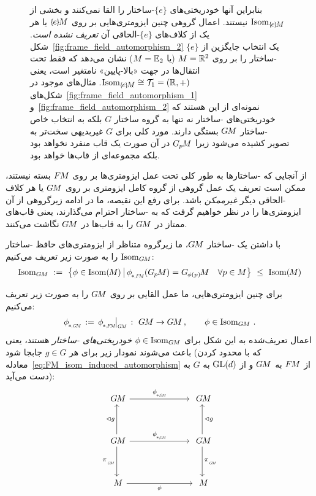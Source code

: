 \begin{figure}
{        بنابراین آنها خودریختی‌های $\{e\}$-ساختار را القا نمی‌کنند و بخشی از $\IsomeM$ نیستند.
        اعمال گروهی چنین ایزومتری‌هایی بر روی $\eM$ یا هر یک از کلاف‌های $\{e\}$-الحاقی آن \emph{تعریف نشده است}.
        شکل~\ref{fig:frame_field_automorphism_2} یک انتخاب جایگزین از $\{e\}$-ساختار را بر روی $M = \mathbb{R}^2$ (یا $M=\mathbb{E}_2$) نشان می‌دهد که فقط تحت انتقال‌ها در جهت «بالا-پایین» نامتغیر است، یعنی $\IsomeM \cong \Trans_1 = (\R,+)$.
        مثال‌های موجود در شکل‌های~\ref{fig:frame_field_automorphism_1} و~\ref{fig:frame_field_automorphism_2} نمونه‌ای از این هستند که خودریختی‌های -ساختار نه تنها به گروه ساختار $G$ بلکه به انتخاب خاص -ساختار $G\mkern-1.4muM$ بستگی دارند.
        مورد کلی برای $G$ غیربدیهی سخت‌تر به تصویر کشیده می‌شود زیرا $G_{\mkern-1.3mu p}\mkern-1.2muM$ در آن صورت یک قاب منفرد نخواهد بود بلکه مجموعه‌ای از قاب‌ها خواهد بود.
        }
    \label{fig:frame_field_automorphism}
\end{figure}
از آنجایی که -ساختارها به طور کلی تحت عمل ایزومتری‌ها بر روی $F\mkern-1.5muM$ بسته نیستند، ممکن است تعریف یک عمل گروهی از گروه کامل ایزومتری بر روی $G\mkern-1.4muM$ یا هر کلاف -الحاقی دیگر \emph{غیرممکن} باشد.
برای رفع این نقیصه، ما در ادامه زیرگروهی از آن ایزومتری‌ها را در نظر خواهیم گرفت که به -ساختار احترام می‌گذارند، یعنی قاب‌های ممتاز در $G\mkern-1.4muM$ را به قاب‌ها در $G\mkern-1.4muM$ نگاشت می‌کنند.
\begin{dfn}
\label{dfn:IsomGM}
    با داشتن یک -ساختار $G\mkern-1.4muM$، ما زیرگروه متناظر از ایزومتری‌های حافظ -ساختار $\operatorname{Isom}_{G\mkern-1.4muM}$ را به صورت زیر تعریف می‌کنیم:
    \begin{align}\label{eq:isomGM_def}
        \IsomGM\ :=\ \big\{ \phi \in \IsomM \,\big|\, \dphiFM(\GpM) = \GphipM\ \ \ \forall p \in M \big\} \ \leq\ \IsomM
    \end{align}
\end{dfn}
برای چنین ایزومتری‌هایی، ما عمل القایی بر روی $G\mkern-1.4muM$ را به صورت زیر تعریف می‌کنیم:
\begin{align}
    \dphiGM\, :=\, \dphiFM \mkern-2mu \big|_{\scalebox{.58}{$\GM$}} \,:\ \GM \to \GM \,, \qquad \phi\in \IsomGM \,.
\end{align}
اعمال تعریف‌شده به این شکل برای $\phi \in \operatorname{Isom}_{G\mkern-1.4muM}$ \emph{خودریختی‌های -ساختار} هستند، یعنی باعث می‌شوند نمودار زیر برای هر $g\in G$ جابجا شود (که با محدود کردن معادله~\eqref{eq:FM_isom_induced_automorphism} از $F\mkern-1.5muM$ به $G\mkern-1.4muM$ و از $\operatorname{GL}(d)$ به $G$ به دست می‌آید):
\begin{equation}\label{cd:isom_induced_GM_automorphism}
\begin{tikzcd}[column sep=70pt, row sep=35, font=\normalsize]
    \GM
        \arrow[r, "\dphiGM"]
    &
    \GM
    \\
    \GM
        \arrow[r, "\dphiGM"]
        \arrow[d, "\piGM"']
        \arrow[u, "\lhd g"]
    &
    \GM
        \arrow[d, "\piGM"]
        \arrow[u, "\lhd g"']
    \\
    M
        \arrow[r, "\phi"']
    &
    M
\end{tikzcd}
\end{equation}
